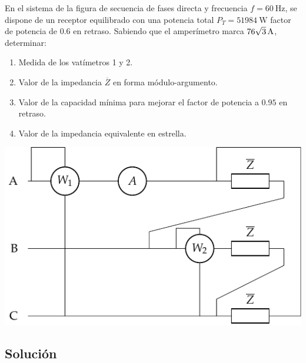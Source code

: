 \begin{minipage}{0.595\textwidth}
  En el sistema de la figura de secuencia de fases directa y frecuencia
  $f=\qty{60}{\hertz}$, se dispone de un receptor equilibrado con una
  potencia total $P_T=\qty{51984}{\watt}$ factor de potencia de $0.6$ en
  retraso. Sabiendo que el amperímetro marca
  $\qty[parse-numbers=false]{76\sqrt{3}}{\ampere}$, determinar:
  \begin{enumerate}
  \item Medida de los vatímetros 1 y 2.
  \item Valor de la impedancia $\overline{Z}$ en forma módulo-argumento.
  \item Valor de la capacidad mínima para mejorar el factor de potencia
    a $0.95$ en retraso.
  \item Valor de la impedancia equivalente en estrella.
  \end{enumerate}
\end{minipage}
\begin{minipage}{0.395\textwidth}
    \includegraphics[width=\linewidth]{figuras/dosvat_triangulo.pdf}
\end{minipage}


\subsection*{Solución}

